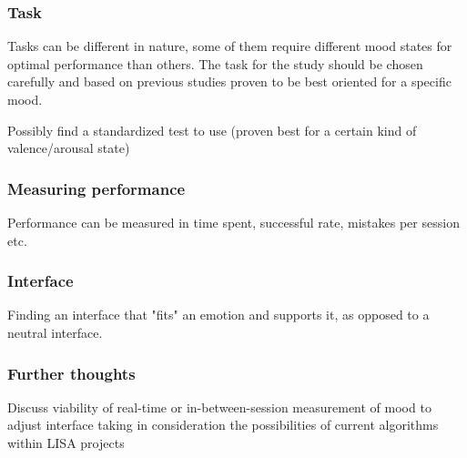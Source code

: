 \subsubsection{Task}

Tasks can be different in nature, some of them require different mood states for optimal performance than others. The task for the study should be chosen carefully and based on previous studies proven to be best oriented for a specific mood.

Possibly find a standardized test to use (proven best for a certain kind of valence/arousal state)

\subsubsection{Measuring performance}

Performance can be measured in time spent, successful rate, mistakes per session etc.

\subsubsection{Interface}

Finding an interface that "fits" an emotion and supports it, as opposed to a neutral interface.

\subsubsection{Further thoughts}
Discuss viability of real-time or in-between-session measurement of mood to adjust interface taking in consideration the possibilities of current algorithms within LISA projects